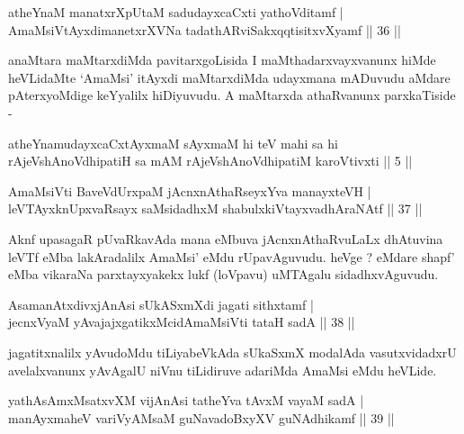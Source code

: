 
\begin{shl}
atheYnaM manatxrXpUtaM sadudayxcaCxti yathoVditamf | \\
AmaMsiVtAyxdimanetxrXVNa tadathARviSakxqqtisitxvXyamf \hfill|| 36 || 
\end{shl}

\begin{artha}
anaMtara maMtarxdiMda pavitarxgoLisida I maMthadarxvayxvanunx hiMde heVLidaMte `AmaMsi' itAyxdi maMtarxdiMda udayxmana mADuvudu aMdare pAterxyoMdige keYyalilx hiDiyuvudu. A maMtarxda athaRvanunx parxkaTiside - 
\end{artha}


\begin{shl}
atheYnamudayxcaCxtAyxmaM sAyxmaM hi teV mahi sa hi rAjeVshAnoV\s dhipatiH sa mAM rAjeVshAnoV\s dhipatiM karoVtivxti || 5 ||
\end{shl}

\begin{shl}
AmaMsiVti BaveVdUrxpaM jAcnxnAthaRseyxYva manayxteVH | \\
leVTAyxknUpxvaRsayx saMsidadhxM shabulxkiVtayxvadhAraNAtf \hfill|| 37 || 
\end{shl}

\begin{artha}
Aknf upasagaR pUvaRkavAda mana eMbuva jAcnxnAthaRvuLaLx dhAtuvina leVTf eMba lakAradalilx AmaMsi' eMdu rUpavAguvudu. heVge ? eMdare shapf' eMba vikaraNa parxtayxyakekx lukf (loVpavu) uMTAgalu sidadhxvAguvudu.
\end{artha}


\begin{shl}
AsamanAtxdivxjAnAsi sUkASxmXdi jagati sithxtamf | \\
jecnxVyaM yAvajajxgatikxMcidAmaMsiVti tataH sadA \hfill|| 38 || 
\end{shl}

\begin{artha}
jagatitxnalilx yAvudoMdu tiLiyabeVkAda sUkaSxmX modalAda vasutxvidadxrU avelalxvanunx yAvAgalU niVnu tiLidiruve adariMda AmaMsi eMdu heVLide.
\end{artha}


\begin{shl}
yathA\s sAmxMsatxvXM vijAnAsi tatheYva tAvxM vayaM sadA | \\
manAyxmaheV variVyAMsaM guNavadoBxyXV guNAdhikamf \hfill|| 39 || 
\end{shl}

